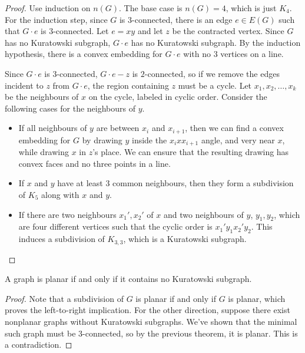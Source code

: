 \begin{proof}
  Use induction on $n(G)$.
  The base case is $n(G) = 4$, which is just $K_4$.
  For the induction step, since $G$ is $3$-connected, there is an edge $e \in
  E(G)$ such that $G \cdot e$ is $3$-connected.
  Let $e = xy$ and let $z$ be the contracted vertex.
  Since $G$ has no Kuratowski subgraph, $G \cdot e$ has no Kuratowski subgraph.
  By the induction hypothesis, there is a convex embedding for $G \cdot e$ with
  no $3$ vertices on a line.

  Since $G \cdot e$ is $3$-connected, $G \cdot e - z$ is $2$-connected, so if we
  remove the edges incident to $z$ from $G \cdot e$, the region containing $z$
  must be a cycle.
  Let $x_1, x_2, \ldots, x_k$ be the neighbours of $x$ on the cycle, labeled in
  cyclic order.
  Consider the following cases for the neighbours of $y$.
  \begin{itemize}
  \item If all neighbours of $y$ are between $x_i$ and $x_{i+1}$, then we can
	find a convex embedding for $G$ by drawing $y$ inside the $x_i x x_{i+1}$
	angle, and very near $x$, while drawing $x$ in $z$'s place.
	We can ensure that the resulting drawing has convex faces and no three
	points in a line.
  \item If $x$ and $y$ have at least $3$ common neighbours, then they form a
	subdivision of $K_5$ along with $x$ and $y$.
  \item If there are two neighbours $x_1', x_2'$ of $x$ and two neighbours of
	$y$, $y_1, y_2$, which are four different vertices such that the cyclic
	order is $x_1' y_1 x_2' y_2$.
	This induces a subdivision of $K_{3,3}$, which is a Kuratowski subgraph.
	\qedhere
  \end{itemize}
\end{proof}

\begin{theorem}[Kuratowski]
  A graph is planar if and only if it contains no Kuratowski subgraph.
\end{theorem}

\begin{proof}
  Note that a subdivision of $G$ is planar if and only if $G$ is planar, which
  proves the left-to-right implication.
  For the other direction, suppose there exist nonplanar graphs without
  Kuratowski subgraphs.
  We've shown that the minimal such graph must be $3$-connected, so by the
  previous theorem, it is planar.
  This is a contradiction.
\end{proof}

